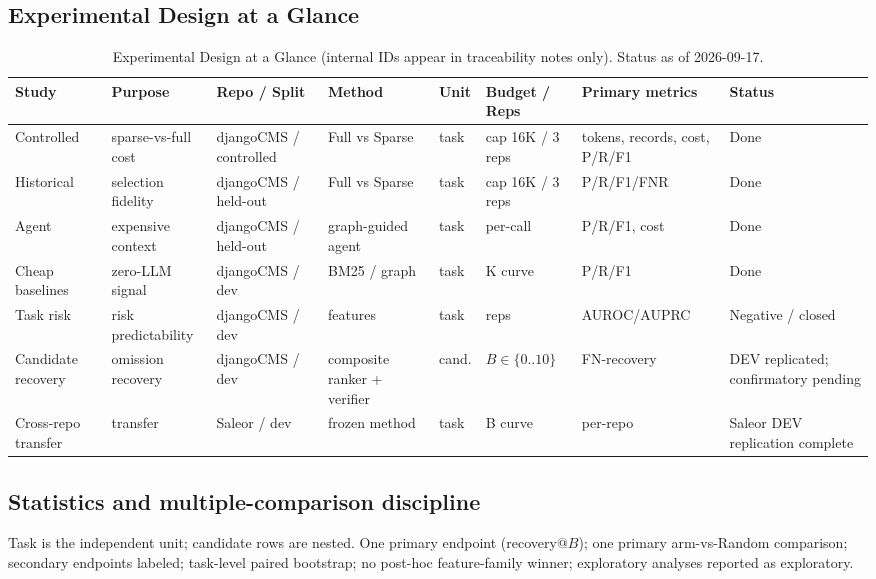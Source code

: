 \documentclass[11pt,a4paper]{article}
\begin{document}
\subsection{Experimental Design at a Glance}
\begin{table}[h]
\centering
\small
\renewcommand{\arraystretch}{1.3}
\setlength{\tabcolsep}{3pt}
\begin{tabularx}{\textwidth}{@{}>{\raggedright\arraybackslash}p{1.7cm}>{\raggedright\arraybackslash}p{1.8cm}>{\raggedright\arraybackslash}p{1.8cm}>{\raggedright\arraybackslash}X>{\raggedright\arraybackslash}p{1.1cm}>{\raggedright\arraybackslash}p{1.6cm}>{\raggedright\arraybackslash}X>{\raggedright\arraybackslash}X@{}}
\toprule
Study & Purpose & Repo / Split & Method & Unit & Budget / Reps & Primary metrics & Status \\
\midrule
Controlled & sparse-vs-full cost & djangoCMS / controlled & Full vs Sparse & task & cap 16K / 3 reps & tokens, records, cost, P/R/F1 & Done \\
Historical & selection fidelity & djangoCMS / held-out & Full vs Sparse & task & cap 16K / 3 reps & P/R/F1/FNR & Done \\
Agent & expensive context & djangoCMS / held-out & graph-guided agent & task & per-call & P/R/F1, cost & Done \\
Cheap baselines & zero-LLM signal & djangoCMS / dev & BM25 / graph & task & K curve & P/R/F1 & Done \\
Task risk & risk predictability & djangoCMS / dev & features & task & 3 reps & AUROC\slash AUPRC & Negative / closed \\
Candidate recovery & omission recovery & djangoCMS / dev & composite ranker + verifier & cand. & $B\in\{0..10\}$ & FN-recovery & DEV replicated; confirmatory pending \\
Cross-repo transfer & transfer & Saleor / dev & frozen method & task & B curve & per-repo & Saleor DEV replication complete \\
\bottomrule
\end{tabularx}
\caption{Experimental Design at a Glance (internal IDs appear in traceability notes only). Status as of 2026-09-17.}
\end{table}

\subsection{Statistics and multiple-comparison discipline}
Task is the independent unit; candidate rows are nested. One primary endpoint
(recovery@$B$); one primary arm-vs-Random comparison; secondary endpoints
labeled; task-level paired bootstrap; no post-hoc feature-family winner;
exploratory analyses reported as exploratory.
\end{document}
